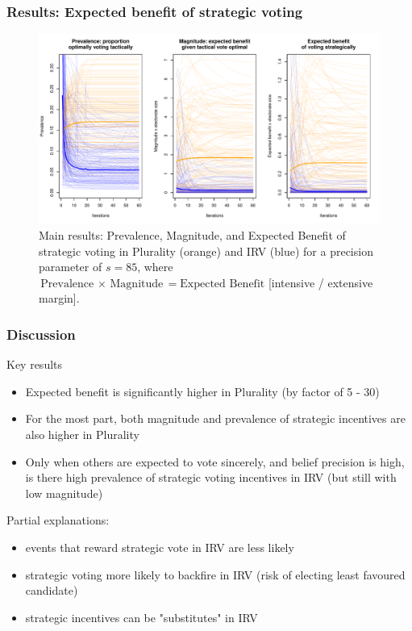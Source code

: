 \documentclass[10pt, en-GB]{beamer}
\begin{document}
\begin{frame}[t]\frametitle{Results: Expected benefit of strategic voting}
    
\begin{figure}
\includegraphics[width = .9\textwidth]{pres_fig/results_85} 
\caption{Main results: Prevalence, Magnitude, and Expected Benefit of strategic voting in Plurality (orange) and IRV (blue) for a precision parameter of $s = 85$, where $\text{Prevalence $\times$ Magnitude} = \text{Expected Benefit}$ [intensive / extensive margin].}
\end{figure}
\end{frame}

\begin{frame}[t]\frametitle{Discussion}
    
\begin{alertblock}{Key results}
\begin{itemize}[<+->]
\item Expected benefit is significantly higher in Plurality (by factor of 5 - 30)
\item For the most part, both magnitude and prevalence of strategic incentives are also higher in Plurality
\item Only when others are expected to vote sincerely, and belief precision is high, is there high prevalence of strategic voting incentives in IRV (but still with low magnitude)
\end{itemize}
\end{alertblock}
\pause
Partial explanations:
\begin{itemize}[<+->]
	\item events that reward strategic vote in IRV are less likely
	\item strategic voting more likely to backfire in IRV (risk of electing least favoured candidate)
	\item strategic incentives can be "substitutes" in IRV
\end{itemize}
\hyperlink{disc}{}

\end{frame}
\end{document}
